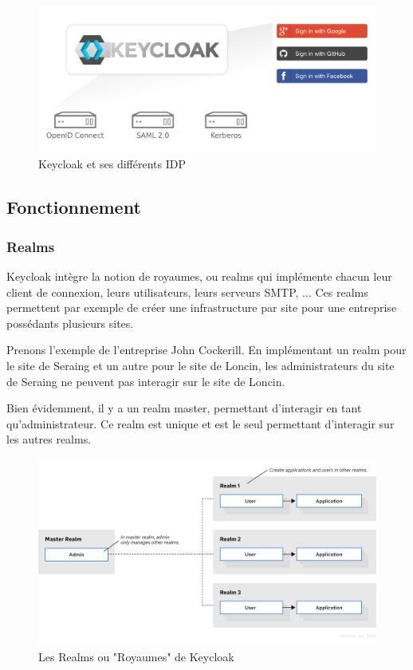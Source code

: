 \begin{figure}[H]
    \centering
    \includegraphics[width=\textwidth]{./img/Keycloak-Identity-Provider.png}
    \caption{Keycloak et ses différents IDP}
    \label{fig:keycloak_idp}
\end{figure}

\subsection{Fonctionnement}

\subsubsection{Realms}

Keycloak intègre la notion de royaumes, ou realms qui implémente chacun leur client de connexion,
leurs utilisateurs, leurs serveurs SMTP, ... Ces realms permettent par exemple de créer une
infrastructure par site pour une entreprise possédants plusieurs sites.

Prenons l'exemple de l'entreprise John Cockerill. En implémentant un realm pour le site de Seraing et
un autre pour le site de Loncin, les administrateurs du site de Seraing ne peuvent pas interagir sur le
site de Loncin.

Bien évidemment, il y a un realm master, permettant d'interagir en tant qu'administrateur. Ce realm
est unique et est le seul permettant d'interagir sur les autres realms.

\begin{figure}[H]
    \centering
    \includegraphics[width=\textwidth]{./img/Keycloak-realm.png}
    \caption{Les Realms ou "Royaumes" de Keycloak}
    \label{fig:keycloak_realms}
\end{figure}

